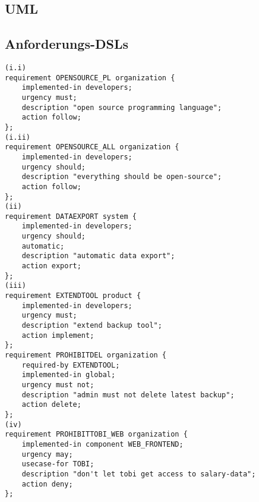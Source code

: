 \documentclass{article}
\begin{document}
\newpage
\subsection{UML}
\newpage

\subsection{Anforderungs-DSLs}
\begin{verbatim}
(i.i)
requirement OPENSOURCE_PL organization {
    implemented-in developers;
    urgency must;
    description "open source programming language";
    action follow;
};
(i.ii)
requirement OPENSOURCE_ALL organization {
    implemented-in developers;
    urgency should;
    description "everything should be open-source";
    action follow;
};
(ii)
requirement DATAEXPORT system {
    implemented-in developers;
    urgency should;
    automatic;
    description "automatic data export";
    action export;
};
(iii)
requirement EXTENDTOOL product {
    implemented-in developers;
    urgency must;
    description "extend backup tool";
    action implement;
};
requirement PROHIBITDEL organization {
    required-by EXTENDTOOL;
    implemented-in global;
    urgency must not;
    description "admin must not delete latest backup";
    action delete;
};
(iv)
requirement PROHIBITTOBI_WEB organization {
    implemented-in component WEB_FRONTEND;
    urgency may;
    usecase-for TOBI;
    description "don't let tobi get access to salary-data";
    action deny;
};
\end{verbatim}
\end{document}
